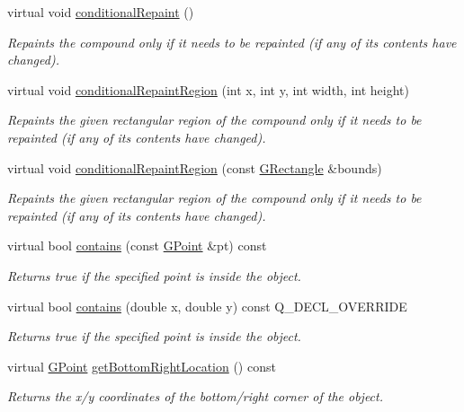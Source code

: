\begin{DoxyCompactItemize}
virtual void \mbox{\hyperlink{classGCompound_a221b3e75bb3d9d0bfea62b3364e6773b}{conditional\+Repaint}} ()
\begin{DoxyCompactList}\small\item\em Repaints the compound only if it needs to be repainted (if any of its contents have changed). \end{DoxyCompactList}\item 
virtual void \mbox{\hyperlink{classGCompound_aedd4b792311d946eeaf44b0de337a408}{conditional\+Repaint\+Region}} (int x, int y, int width, int height)
\begin{DoxyCompactList}\small\item\em Repaints the given rectangular region of the compound only if it needs to be repainted (if any of its contents have changed). \end{DoxyCompactList}\item 
virtual void \mbox{\hyperlink{classGCompound_a3932a12278752db368e24fa404e446aa}{conditional\+Repaint\+Region}} (const \mbox{\hyperlink{classGRectangle}{G\+Rectangle}} \&bounds)
\begin{DoxyCompactList}\small\item\em Repaints the given rectangular region of the compound only if it needs to be repainted (if any of its contents have changed). \end{DoxyCompactList}\item 
virtual bool \mbox{\hyperlink{classGObject_a1dbc9dafaae51958112dbe1267a1f547}{contains}} (const \mbox{\hyperlink{classGPoint}{G\+Point}} \&pt) const
\begin{DoxyCompactList}\small\item\em Returns {\ttfamily true} if the specified point is inside the object. \end{DoxyCompactList}\item 
virtual bool \mbox{\hyperlink{classGCompound_aa095a031ab22c150d2d75fdda1c3c8f5}{contains}} (double x, double y) const Q\+\_\+\+D\+E\+C\+L\+\_\+\+O\+V\+E\+R\+R\+I\+DE
\begin{DoxyCompactList}\small\item\em Returns {\ttfamily true} if the specified point is inside the object. \end{DoxyCompactList}\item 
virtual \mbox{\hyperlink{classGPoint}{G\+Point}} \mbox{\hyperlink{classGObject_a0d41183bf6b08de66fe3907551aab0d7}{get\+Bottom\+Right\+Location}} () const
\begin{DoxyCompactList}\small\item\em Returns the x/y coordinates of the bottom/right corner of the object. \end{DoxyCompactList}\item 

\end{DoxyCompactItemize}

